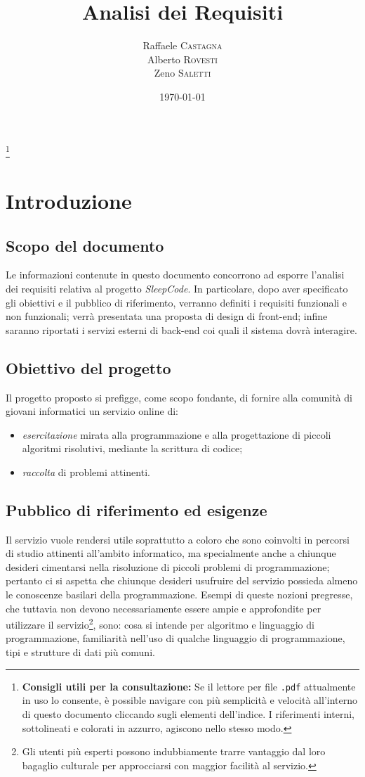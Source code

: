 \documentclass[11pt, a4paper]{article}
\title{Analisi dei Requisiti}
\author{Raffaele \textsc{Castagna}\\
Alberto \textsc{Rovesti}\\
Zeno \textsc{Saletti}}
\date{\today}
\theoremstyle{definition}
\newcommand\blfootnote[1]{%
  \begingroup
  \renewcommand\thefootnote{}\footnote{#1}%
  \addtocounter{footnote}{-1}%
  \endgroup
}
\begin{document}


\tableofcontents\blfootnote{\textbf{Consigli utili per la consultazione:} Se il lettore per file \texttt{.pdf} attualmente in uso lo consente, è possible navigare con più semplicità e velocità all'interno di questo documento cliccando sugli elementi dell'indice. I riferimenti interni, sottolineati e colorati in azzurro, agiscono nello stesso modo.}


\newpage
\section{Introduzione}
\subsection{Scopo del documento}
Le informazioni contenute in questo documento concorrono ad esporre l'analisi
dei requisiti relativa al progetto \textit{SleepCode}. In particolare, dopo
aver specificato gli obiettivi e il pubblico di riferimento, verranno definiti i requisiti
funzionali e non funzionali; verrà presentata una proposta di design di
front-end; infine saranno riportati i servizi esterni di back-end coi quali il
sistema dovrà interagire.


\subsection{Obiettivo del progetto}
Il progetto proposto si prefigge, come scopo fondante, di fornire alla comunità
di giovani informatici un servizio online di:
\begin{itemize}
    \item \textit{esercitazione} mirata alla programmazione e alla progettazione
    di piccoli algoritmi risolutivi, mediante la scrittura di codice;
    \item \textit{raccolta} di problemi attinenti.
\end{itemize}

\subsection{Pubblico di riferimento ed esigenze}
Il servizio vuole rendersi utile soprattutto a coloro che sono coinvolti
in percorsi di studio attinenti all'ambito informatico, ma specialmente anche
a chiunque desideri cimentarsi nella risoluzione di piccoli problemi di
programmazione; pertanto ci si aspetta che chiunque desideri usufruire del
servizio possieda almeno le conoscenze basilari della programmazione. Esempi
di queste nozioni pregresse, che tuttavia non devono necessariamente essere ampie e approfondite per utilizzare il servizio\footnote{Gli utenti più esperti possono indubbiamente trarre vantaggio dal loro bagaglio culturale per
approcciarsi con maggior facilità al servizio.}, sono: cosa si intende per
algoritmo e linguaggio di programmazione, familiarità nell'uso di qualche
linguaggio di programmazione, tipi e strutture di dati più comuni.
\end{document}
